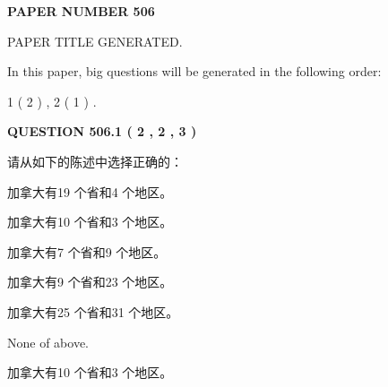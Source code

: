 \documentclass{ctexart}
\begin{document}
   
   
   
\newpage 
\setcounter{page}{ 
   506001 } 
   
   
   
   
 {\textbf{ \Large{ PAPER NUMBER  506  }}}
   
   
\vspace{0.2in}
   
   
   
   
   
   
   
   
 \vspace{0.2in}
 
 
 
 
   
   
 PAPER TITLE GENERATED.
   
   
   
\vspace{0.2in}
   
In this paper, big questions will be generated in the following order: 
   
   
   1 ( 2 )
 ,
   2 ( 1 )
 .
  
\vspace{0.2in}
  
{\textbf{\Large{QUESTION
506.1 
 ( 2 , 2 , 3 )
}}}
  
  
请从如下的陈述中选择正确的：
 
 
加拿大有19 个省和4 个地区。
 
 
加拿大有10 个省和3 个地区。
 
 
加拿大有7 个省和9 个地区。
 
 
加拿大有9 个省和23 个地区。
 
 
加拿大有25 个省和31 个地区。
 
 
 None of above.
 
 
\noindent{}
 
 
加拿大有10 个省和3 个地区。
 
 
\noindent{}
 
 
   
   
   
\end{document}
